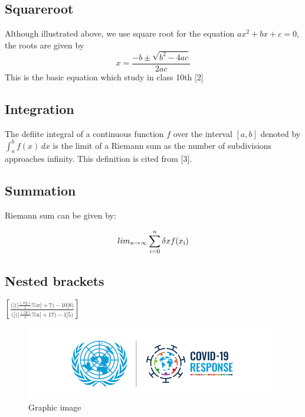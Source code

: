 \documentclass[10pt]{article}
\begin{document}
\subsection{Squareroot}
Although illustrated above, we use square root for the equation $ax^2+bx+c=0$, the roots are given by
$$ x = \frac{-b \pm \sqrt{b^2-4ac}}{2ac} $$
This is the basic equation which study in class 10th [2]

\newpage

\subsection{Integration}
The defiite integral of a continuous function $f$ over the interval $[a, b]$ denoted by $\int_{a}^{b}f(x) \,dx$ is the limit of a Riemann sum as the number of subdivisions  approaches infinity. This definition is cited from [3].

\subsection{Summation}
Riemann sum can be given by:

$$
lim_{n\rightarrow\infty}\displaystyle \sum\limits_{i=0}^n\delta x f(x\textsubscript{i}) 
$$


\subsection{Nested brackets}

$
\left[\frac{\Bigg(\bigg[\Big(\big[\frac{(xy)}{z}\%w\big]+7\Big)-10\bigg]8\Bigg)}{\Bigg(\bigg[\Big(\big[\frac{(zy)}{x}\%u\big]+17\Big)-1\bigg]5\Bigg)}\right]
$


\newpage

\begin{figure}
\centering
\includegraphics[scale=0.7]{covid.png}
\caption{Graphic image}
\end{figure}
\end{document}
